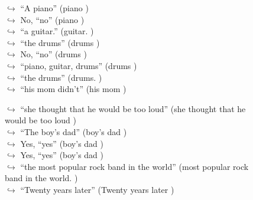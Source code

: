 \documentclass[11pt,a4paper, onecolumn]{article}
\begin{document}
\begin{figure}[t] \small \begin{tcolorbox}[boxsep=0pt,left=5pt,right=0pt,top=2pt,colback = yellow!5] \begin{dialogue}
 \small 
\colorbox{pink!25}{$\hookrightarrow$}
{ ``A piano'' (piano ) }
\\
\colorbox{pink!25}{$\hookrightarrow$}
\colorbox{red!25}{No,}
{ ``no'' (piano ) }
\\
\colorbox{pink!25}{$\hookrightarrow$}
{ ``a guitar.'' (guitar. ) }
\\
\colorbox{pink!25}{$\hookrightarrow$}
{ ``the drums'' (drums ) }
\\
\colorbox{pink!25}{$\hookrightarrow$}
\colorbox{red!25}{No,}
{ ``no'' (drums ) }
\\
\colorbox{pink!25}{$\hookrightarrow$}
{ ``piano, guitar, drums'' (drums ) }
\\
\colorbox{pink!25}{$\hookrightarrow$}
{ ``the drums'' (drums. ) }
\\
\colorbox{pink!25}{$\hookrightarrow$}
{ ``his mom didn't'' (his mom ) }
 \end{dialogue}\end{tcolorbox}\end{figure}\begin{figure}[t] \small \begin{tcolorbox}[boxsep=0pt,left=5pt,right=0pt,top=2pt,colback = yellow!5] \begin{dialogue}
 \small 
\colorbox{pink!25}{$\hookrightarrow$}
{ ``she thought that he would be too loud'' (she thought that he would be too loud ) }
\\
\colorbox{pink!25}{$\hookrightarrow$}
{ ``The boy's dad'' (boy's dad ) }
\\
\colorbox{pink!25}{$\hookrightarrow$}
\colorbox{red!25}{Yes,}
{ ``yes'' (boy's dad ) }
\\
\colorbox{pink!25}{$\hookrightarrow$}
\colorbox{red!25}{Yes,}
{ ``yes'' (boy's dad ) }
\\
\colorbox{pink!25}{$\hookrightarrow$}
{ ``the most popular rock band in the world'' (most popular rock band in the world. ) }
\\
\colorbox{pink!25}{$\hookrightarrow$}
{ ``Twenty years later'' (Twenty years later ) }
\\
 \end{dialogue}\end{tcolorbox}\end{figure}
\end{document}
